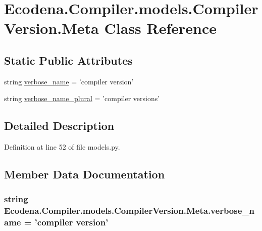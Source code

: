 \hypertarget{class_ecodena_1_1_compiler_1_1models_1_1_compiler_version_1_1_meta}{
\section{Ecodena.Compiler.models.CompilerVersion.Meta Class Reference}
\label{d7/d7b/class_ecodena_1_1_compiler_1_1models_1_1_compiler_version_1_1_meta}
}
\subsection*{Static Public Attributes}
\begin{DoxyCompactItemize}
\item 
string \hyperlink{class_ecodena_1_1_compiler_1_1models_1_1_compiler_version_1_1_meta_a3fec409e9d01fdd101a80a10c48aced4}{verbose\_\-name} = 'compiler version'
\item 
string \hyperlink{class_ecodena_1_1_compiler_1_1models_1_1_compiler_version_1_1_meta_a41dfc813d5bc5fcfbfaf58b6aee9624a}{verbose\_\-name\_\-plural} = 'compiler versions'
\end{DoxyCompactItemize}


\subsection{Detailed Description}


Definition at line 52 of file models.py.



\subsection{Member Data Documentation}
\hypertarget{class_ecodena_1_1_compiler_1_1models_1_1_compiler_version_1_1_meta_a3fec409e9d01fdd101a80a10c48aced4}{
\subsubsection[{verbose\_\-name}]{\setlength{\rightskip}{0pt plus 5cm}string {\bf Ecodena.Compiler.models.CompilerVersion.Meta.verbose\_\-name} = 'compiler version'}}
\label{d7/d7b/class_ecodena_1_1_compiler_1_1models_1_1_compiler_version_1_1_meta_a3fec409e9d01fdd101a80a10c48aced4}


